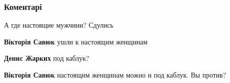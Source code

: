  
 
 
 
 
\subsubsection{Коментарі}
\label{sec:12_09_2021.fb.zharkih_denis.1.pan_danilskij.cmt}

\begin{itemize} %
 
А где настоящие мужчини? Сдулись

\begin{itemize} %
 
\textbf{Вікторія Савюк} ушли к настоящим женщинам

 
\textbf{Денис Жарких} под каблук?

 
\textbf{Вікторія Савюк} настоящим женщинам можно и под каблук. Вы против?

 

\end{itemize}
\end{itemize}
